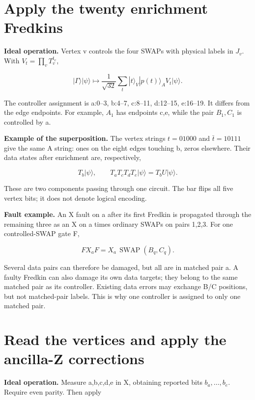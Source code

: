 \documentclass[11pt]{article}
\begin{document}
\section{Apply the twenty enrichment Fredkins}
\textbf{Ideal operation.} Vertex v controls the four SWAPs with physical labels in \(J_v\). With \(V_t=\prod_vT_v^{t_v}\),

\[
|\Gamma\rangle|\psi\rangle
\longmapsto
\frac1{\sqrt{32}}\sum_t |t\rangle_V|p(t)\rangle_A V_t|\psi\rangle.
\]

\begin{center}\begin{minipage}{\linewidth}

\end{minipage}\end{center}

The controller assignment is a:0--3, b:4--7, c:8--11, d:12--15, e:16--19. It differs from the edge endpoints. For example, \(A_1\) has endpoints c,e, while the pair \(B_1,C_1\) is controlled by a.

\textbf{Example of the superposition.} The vertex strings \(t=01000\) and \(\bar t=10111\) give the same A string: ones on the eight edges touching b, zeros elsewhere. Their data states after enrichment are, respectively,

\[
T_b|\psi\rangle,\qquad T_aT_cT_dT_e|\psi\rangle=T_bU|\psi\rangle.
\]

These are two components passing through one circuit. The bar flips all five vertex bits; it does not denote logical encoding.

\textbf{Fault example.} An X fault on a after its first Fredkin is propagated through the remaining three as an X on a times ordinary SWAPs on pairs 1,2,3. For one controlled-SWAP gate F,

\[
F X_a F=X_a\,\operatorname{SWAP}(B_q,C_q).
\]

Several data pairs can therefore be damaged, but all are in matched pair a. A faulty Fredkin can also damage its own data targets; they belong to the same matched pair as its controller. Existing data errors may exchange B/C positions, but not matched-pair labels. This is why one controller is assigned to only one matched pair.

\section{Read the vertices and apply the ancilla-Z corrections}
\textbf{Ideal operation.} Measure a,b,c,d,e in X, obtaining reported bits \(b_a,\ldots,b_e\). Require even parity. Then apply
\end{document}
